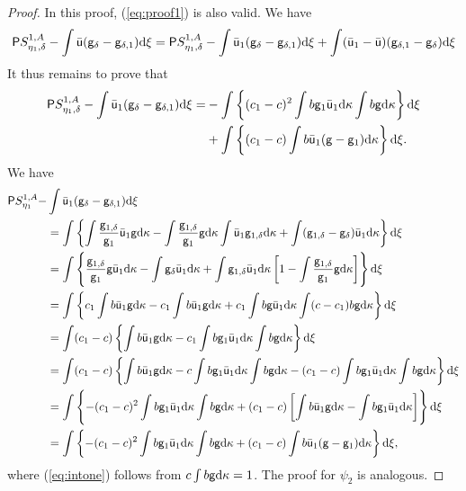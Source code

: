 \begin{proof}
  In this proof, (\ref{eq:proof1}) is also valid. We have
  \[\mathsf{P} S_{\eta_1,\delta}^{1,A} - \int\bar{\mathsf{u}}(\mathsf{g}_\delta -
    \mathsf{g}_{\delta,1})\mathrm{d}\xi = \mathsf{P} S_{\eta_1,\delta}^{1,A} - \int\bar{\mathsf{u}}_1(\mathsf{g}_\delta -
    \mathsf{g}_{\delta,1})\mathrm{d}\xi + \int(\bar{\mathsf{u}}_1-\bar{\mathsf{u}})(\mathsf{g}_{\delta,1}-\mathsf{g}_\delta)\mathrm{d}\xi\]
It thus remains to
  prove that
  \begin{align*}
    \mathsf{P} S_{\eta_1,\delta}^{1,A} - \int\bar{\mathsf{u}}_1(\mathsf{g}_\delta -
    \mathsf{g}_{\delta,1})\mathrm{d}\xi = & -\int\left\{(c_1-c)^2\int b
      \mathsf{g}_1\bar{\mathsf{u}}_1\mathrm{d}\kappa\int b
      \mathsf{g}\mathrm{d}\kappa\right\}\mathrm{d}\xi\\
    &+\int \left\{(c_1-c)\int b\bar{\mathsf{u}}_1(\mathsf{g}-\mathsf{g}_1)\mathrm{d}\kappa\right\}\mathrm{d}\xi.
  \end{align*}
  We have
  \begin{align}
    \mathsf{P} S_{\eta_1}^{1,A} -
    & \int\bar{\mathsf{u}}_1(\mathsf{g}_{\delta}-\mathsf{g}_{\delta,1})\mathrm{d}\xi\notag\\
    &=\int\left\{\int\frac{\mathsf{g}_{1,\delta}}{\mathsf{g}_1}\bar{\mathsf{u}}_1 \mathsf{g}\mathrm{d}\kappa
      -\int \frac{\mathsf{g}_{1,\delta}}{\mathsf{g}_1}\mathsf{g}\mathrm{d}\kappa\int\bar{\mathsf{u}}_1 \mathsf{g}_{1,\delta}\mathrm{d}\kappa + \int(\mathsf{g}_{1,\delta} -
      \mathsf{g}_\delta)\bar{\mathsf{u}}_1\mathrm{d}\kappa\right\}\mathrm{d}\xi\notag\\
    &=\int\left\{\frac{\mathsf{g}_{1,\delta}}{\mathsf{g}_1}\mathsf{g}\bar{\mathsf{u}}_1\mathrm{d}\kappa - \int \mathsf{g}_\delta\bar{\mathsf{u}}_1\mathrm{d}\kappa + \int
      \mathsf{g}_{1,\delta}\bar{\mathsf{u}}_1\mathrm{d}\kappa\left[1-\int\frac{\mathsf{g}_{1,\delta}}{\mathsf{g}_1}\mathsf{g}\mathrm{d}\kappa\right]\right\}
      \mathrm{d}\xi\notag\\
    &=\int\left\{c_1\int
      b\bar{\mathsf{u}}_1 \mathsf{g}\mathrm{d}\kappa
      - c_1\int
      b\bar{\mathsf{u}}_1
      \mathsf{g}\mathrm{d}\kappa
      + c_1\int
      b\mathsf{g}\bar{\mathsf{u}}_1\mathrm{d}\kappa\int(c-c_1)b\mathsf{g}\mathrm{d}\kappa\right\}\mathrm{d}\xi\notag\\
    &=\int(c_1-c)\left\{\int b\bar{\mathsf{u}}_1 \mathsf{g}\mathrm{d}\kappa - c_1\int b
      \mathsf{g}_1\bar{\mathsf{u}}_1\mathrm{d}\kappa\int b \mathsf{g}\mathrm{d}\kappa\right\}\mathrm{d}\xi\notag\\
    &=\int(c_1-c)\left\{\int b\bar{\mathsf{u}}_1 \mathsf{g}\mathrm{d}\kappa - c\int b
      \mathsf{g}_1\bar{\mathsf{u}}_1\mathrm{d}\kappa\int b \mathsf{g}\mathrm{d}\kappa - (c_1-c)\int b
      \mathsf{g}_1\bar{\mathsf{u}}_1\mathrm{d}\kappa\int b \mathsf{g}\mathrm{d}\kappa\right\}\mathrm{d}\xi\notag\\
    &=\int\left\{-(c_1-c)^2\int b
      \mathsf{g}_1\bar{\mathsf{u}}_1\mathrm{d}\kappa\int b \mathsf{g}\mathrm{d}\kappa + (c_1-c)\left[\int
      b\bar{\mathsf{u}}_1 \mathsf{g}\mathrm{d}\kappa - \int
      b\mathsf{g}_1\bar{\mathsf{u}}_1\mathrm{d}\kappa\right]\right\}\mathrm{d}\xi\label{eq:intone}\\
    &=\int\left\{-(c_1-c)^2\int b
      \mathsf{g}_1\bar{\mathsf{u}}_1\mathrm{d}\kappa\int b \mathsf{g}\mathrm{d}\kappa + (c_1-c)\int b\bar{\mathsf{u}}_1(\mathsf{g}-\mathsf{g}_1)\mathrm{d}\kappa\right\}\mathrm{d}\xi\notag,
  \end{align}
  where (\ref{eq:intone}) follows from $c\int b \mathsf{g}\mathrm{d}\kappa = 1$. The proof for
  $\psi_2$ is analogous.
\end{proof}

